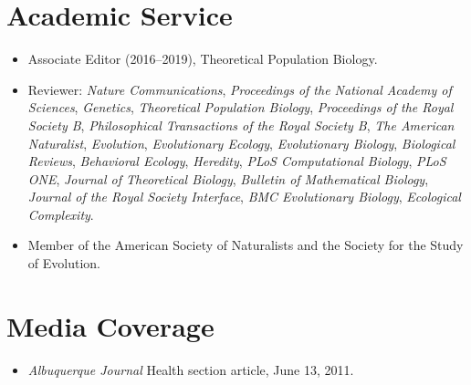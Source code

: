 \documentclass[11pt]{article}
\begin{document}

  \section{Academic Service}
  \begin{itemize}
    \item Associate Editor (2016--2019), Theoretical Population Biology.
    \item Reviewer: \textit{Nature Communications}, \textit{Proceedings of the National Academy of Sciences}, \textit{Genetics}, \textit{Theoretical Population Biology}, \textit{Proceedings of the Royal Society B}, \textit{Philosophical Transactions of the Royal Society B}, \textit{The American Naturalist}, \textit{Evolution}, \textit{Evolutionary Ecology}, \textit{Evolutionary Biology}, \textit{Biological Reviews}, \textit{Behavioral Ecology}, \textit{Heredity}, \textit{PLoS Computational Biology}, \textit{PLoS ONE}, \textit{Journal of Theoretical Biology}, \textit{Bulletin of Mathematical Biology}, \textit{Journal of the Royal Society Interface}, \textit{BMC Evolutionary Biology}, \textit{Ecological Complexity}.
  \item Member of the American Society of Naturalists and the Society for the Study of Evolution.
  \end{itemize}
  

  \section{Media Coverage}
  \begin{itemize}
  \item \textit{Albuquerque Journal} Health section article, June 13, 2011.
  \end{itemize}


  \pagestyle{fancy}
\end{document}
